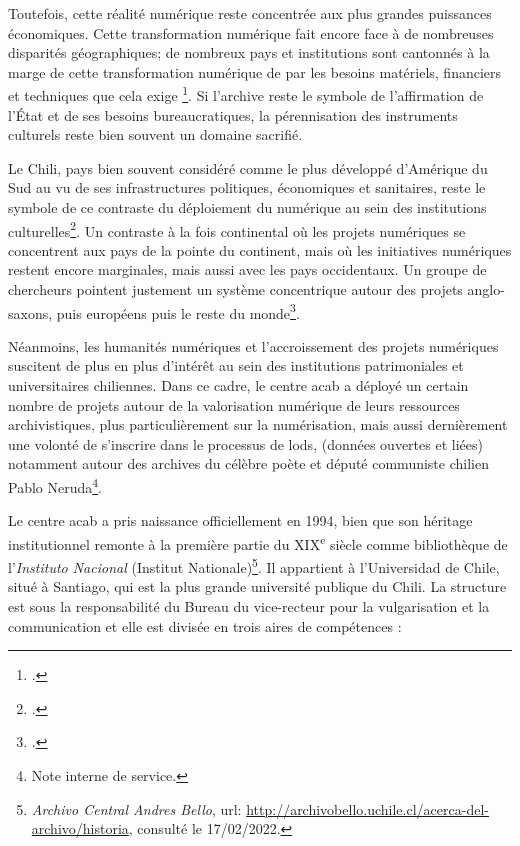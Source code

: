 Toutefois, cette réalité numérique reste concentrée aux plus grandes puissances économiques. Cette transformation numérique fait encore face à de nombreuses disparités géographiques; de nombreux pays et institutions sont cantonnés à la marge de cette transformation numérique de par les besoins matériels, financiers et techniques que cela exige \footcite{wissikTeachingDigitalHumanities2020a}. Si l'archive reste le symbole de l'affirmation de l'État et de ses besoins bureaucratiques, la pérennisation des instruments culturels reste bien souvent un domaine sacrifié. \par

Le Chili, pays bien souvent considéré comme le plus développé d'Amérique du Sud au vu de ses infrastructures politiques, économiques et sanitaires, reste le symbole de ce contraste du déploiement du numérique au sein des institutions culturelles\footcite{undpNextFrontierHuman2020a}. Un contraste à la fois continental où les projets numériques se concentrent aux pays de la pointe du continent, mais où les initiatives numériques restent encore marginales, mais aussi avec les pays occidentaux. Un groupe de chercheurs pointent justement un système concentrique autour des projets anglo-saxons, puis européens puis le reste du monde\footcite{russellGeographicalLinguisticDiversity}.\newpar

Néanmoins, les humanités numériques et l'accroissement des projets numériques suscitent de plus en plus d'intérêt au sein des institutions patrimoniales et universitaires chiliennes. Dans ce cadre, le centre \gls{acab} a déployé un certain nombre de projets autour de la valorisation numérique de leurs ressources archivistiques, plus particulièrement sur la numérisation, mais aussi dernièrement une volonté de s'inscrire dans le processus de \glspl{lod}, (données ouvertes et liées) notamment autour des archives du célèbre poète et député communiste chilien Pablo Neruda\footnote{Note interne de service.}.\par

Le centre \gls{acab} a pris naissance officiellement en 1994, bien que son héritage institutionnel remonte à la première partie du XIX\textsuperscript{e} siècle comme bibliothèque de l'\textit{Instituto Nacional} (Institut Nationale)\footnote{\textit{Archivo Central Andres Bello}, url: \url{http://archivobello.uchile.cl/acerca-del-archivo/historia}, consulté le 17/02/2022.}. Il appartient à l'Universidad de Chile, situé à Santiago, qui est la plus grande université publique du Chili. La structure est sous la responsabilité du Bureau du vice-recteur pour la vulgarisation et la communication et elle est divisée en trois aires de compétences :

